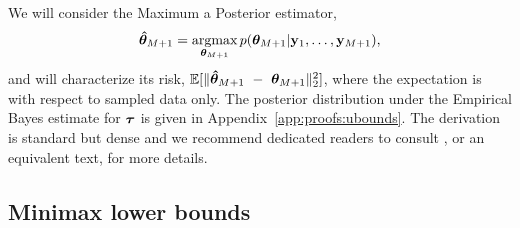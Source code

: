      
    



We will consider the Maximum a Posterior estimator,
\[\bm{\hat{\theta}}_{M+1} = \operatorname*{\textrm{argmax}}_{\bm{\theta}_{M+1}}p(\bm{\theta}_{M+1}|\mathbf{y}_1,\ldots,\mathbf{y}_{M+1}),\]
and will characterize its risk, $\mathbb{E}[\lVert \bm{\hat{\theta}}_{M+1}~-~\bm{\theta}_{M+1} \rVert_2^2]$, where the expectation is with respect to sampled data only. The posterior distribution under the Empirical Bayes estimate for $\bm{\tau}$ is given in Appendix~\ref{app:proofs:ubounds}. The derivation is standard but dense and we recommend dedicated readers to consult \citet{gelman2013bayesian}, or an equivalent text, for more details.

\subsection{Minimax lower bounds}

